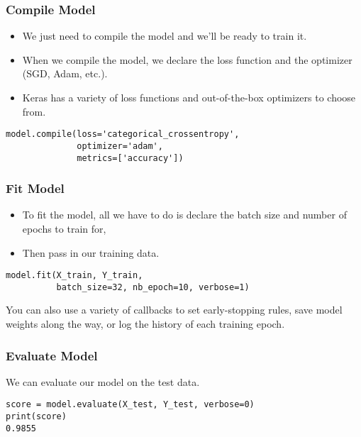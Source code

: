 \begin{frame}[fragile] \frametitle{Compile Model}

\begin{itemize}
\item We just need to compile the model and we'll be ready to train it. 
\item When we compile the model, we declare the loss function and the optimizer (SGD, Adam, etc.).
\item Keras has a variety of loss functions and out-of-the-box optimizers to choose from.
\end{itemize}
\begin{lstlisting}
model.compile(loss='categorical_crossentropy',
              optimizer='adam',
              metrics=['accuracy'])
\end{lstlisting}
\end{frame}

\begin{frame}[fragile] \frametitle{Fit Model}

\begin{itemize}
\item To fit the model, all we have to do is declare the batch size and number of epochs to train for, 
\item Then pass in our training data.
\end{itemize}
\begin{lstlisting}
model.fit(X_train, Y_train, 
          batch_size=32, nb_epoch=10, verbose=1)
\end{lstlisting}
You can also use a variety of callbacks to set early-stopping rules, save model weights along the way, or log the history of each training epoch.
\end{frame}

\begin{frame}[fragile] \frametitle{Evaluate Model}
We can evaluate our model on the test data.
\begin{lstlisting}
score = model.evaluate(X_test, Y_test, verbose=0)
print(score)
0.9855
\end{lstlisting}

\end{frame}



    
